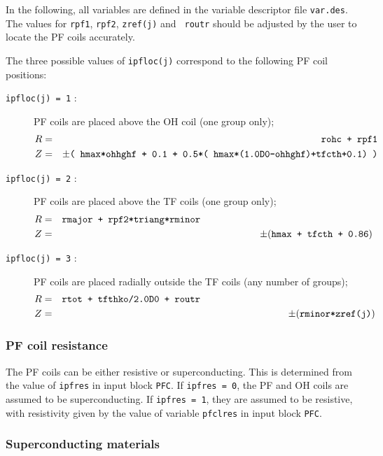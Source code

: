 In the following, all variables are defined in the variable descriptor file
{\tt var.des}. The values for {\tt rpf1}, {\tt rpf2}, {\tt zref(j)} and {\tt
routr} should be adjusted by the user to locate the PF coils accurately.

The three possible values of {\tt ipfloc(j)} correspond to the following PF
coil positions:

\setlength{\parskip}{0mm}
\begin{description}
\item [{\tt ipfloc(j) = 1} :]  PF coils are placed above the OH coil (one
group only);
\footnotesize
\begin{eqnarray*}
R & = & \mbox{\tt rohc + rpf1} \\
Z & = & \pm
\mbox{\tt ( hmax*ohhghf + 0.1 + 0.5*( hmax*(1.0D0-ohhghf)+tfcth+0.1) )}
\end{eqnarray*}
\normalsize
\item [{\tt ipfloc(j) = 2} :]  PF coils are placed above the TF coils (one
group only);
\footnotesize
\begin{eqnarray*}
R & = & \mbox{\tt rmajor + rpf2*triang*rminor} \hspace{62mm} \\
Z & = & \pm (\mbox{\tt hmax + tfcth + 0.86})
\end{eqnarray*}
\normalsize
\item [{\tt ipfloc(j) = 3} :]  PF coils are placed radially outside the TF
coils (any number of groups);
\footnotesize
\begin{eqnarray*}
R & = & \mbox{\tt rtot + tfthko/2.0D0 + routr} \hspace{63mm}\\
Z & = & \pm(\mbox{\tt rminor*zref(j)})
\end{eqnarray*}
\normalsize
\end{description}

\subsubsection{PF coil resistance}

The PF coils can be either resistive or superconducting. This is determined
from the value of {\tt ipfres} in input block {\tt PFC}. If {\tt ipfres = 0},
the PF and OH coils are assumed to be superconducting. If {\tt ipfres = 1},
they are assumed to be resistive, with resistivity given by the value of
variable {\tt pfclres} in input block {\tt PFC}.

\subsubsection{Superconducting materials}

